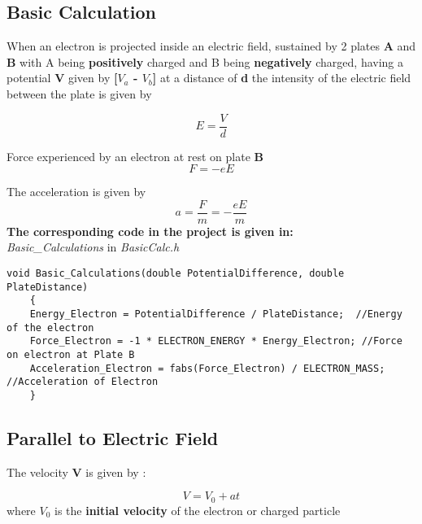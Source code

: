 \documentclass[a4paper,20pt,twoside]{report}
\begin{document}
	\subsection{Basic Calculation}
		When an electron is projected inside an electric field, sustained by 2 plates
		\textbf{A} and \textbf{B}
		with A being 
		\textbf{positively}
		charged and B being
		\textbf{negatively}
	    charged, having a potential
		\textbf{V}
		 given by
		\textbf{[$V_a$ - $V_b$]}
		at a distance of \textbf{d}
		 the intensity of the electric field between the plate is given by
		
		\begin{equation}
		E = \frac{V}{d}
		\end{equation}
		
		
		Force experienced by an electron at rest on plate
		\textbf{B}
		\begin{equation}
		F = -eE
		\end{equation}
		
		\textnormal{The acceleration is given by}
		\begin{equation}
		a = \frac{F}{m} = -\frac{eE}{m}
		\end{equation}
		\vspace{10mm}
		\textbf{The corresponding code in the project is given in:\\}
		\vspace{2mm}
		\textit{Basic\_Calculations} \textnormal{in }\textit{BasicCalc.h}
		\vspace{2mm}
		
		\begin{lstlisting}[basicstyle=\linespread{0}]
	void Basic_Calculations(double PotentialDifference, double PlateDistance)
	{
	Energy_Electron = PotentialDifference / PlateDistance;  //Energy of the electron
	Force_Electron = -1 * ELECTRON_ENERGY * Energy_Electron; //Force on electron at Plate B
	Acceleration_Electron = fabs(Force_Electron) / ELECTRON_MASS;  //Acceleration of Electron
	}
		\end{lstlisting}
		
		
		\subsection{Parallel to Electric Field}
			The velocity  \textbf{V} is given by :
			
			\begin{equation}
			V = V_0 + at
			\end{equation}
			where $V_0$ is the \textbf{initial velocity} of the electron or charged particle
			
\end{document}
